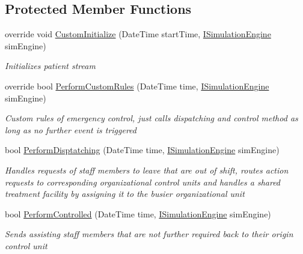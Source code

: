 \subsection*{Protected Member Functions}
\begin{DoxyCompactItemize}
\item 
override void \hyperlink{class_sample_hospital_model_1_1_emergency_1_1_control_unit_emergency_example_a13a754c15b8c7db6d1d074f2bf2c463f}{Custom\+Initialize} (Date\+Time start\+Time, \hyperlink{interface_simulation_core_1_1_simulation_classes_1_1_i_simulation_engine}{I\+Simulation\+Engine} sim\+Engine)
\begin{DoxyCompactList}\small\item\em Initializes patient stream \end{DoxyCompactList}\item 
override bool \hyperlink{class_sample_hospital_model_1_1_emergency_1_1_control_unit_emergency_example_ad22442ea971211b02ad491bff2c881e9}{Perform\+Custom\+Rules} (Date\+Time time, \hyperlink{interface_simulation_core_1_1_simulation_classes_1_1_i_simulation_engine}{I\+Simulation\+Engine} sim\+Engine)
\begin{DoxyCompactList}\small\item\em Custom rules of emergency control, just calls dispatching and control method as long as no further event is triggered \end{DoxyCompactList}\item 
bool \hyperlink{class_sample_hospital_model_1_1_emergency_1_1_control_unit_emergency_example_ad55710cbabacaddd3f75ea78730889a1}{Perform\+Disptatching} (Date\+Time time, \hyperlink{interface_simulation_core_1_1_simulation_classes_1_1_i_simulation_engine}{I\+Simulation\+Engine} sim\+Engine)
\begin{DoxyCompactList}\small\item\em Handles requests of staff members to leave that are out of shift, routes action requests to corresponding organizational control units and handles a shared treatment facility by assigning it to the busier organizational unit \end{DoxyCompactList}\item 
bool \hyperlink{class_sample_hospital_model_1_1_emergency_1_1_control_unit_emergency_example_aa5396f38dc18b7e2623e3b97eb54cd19}{Perform\+Controlled} (Date\+Time time, \hyperlink{interface_simulation_core_1_1_simulation_classes_1_1_i_simulation_engine}{I\+Simulation\+Engine} sim\+Engine)
\begin{DoxyCompactList}\small\item\em Sends assisting staff members that are not further required back to their origin control unit \end{DoxyCompactList}\end{DoxyCompactItemize}
